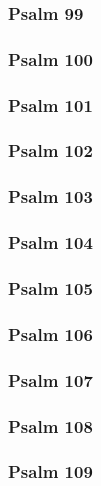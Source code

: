\documentclass[10pt]{extarticle}
\begin{document}
\begin{multicols}{2}
\subsubsection{Psalm 99}

\newpage

\subsubsection{Psalm 100}

\newpage

\subsubsection{Psalm 101}

\newpage

\subsubsection{Psalm 102}

\newpage

\subsubsection{Psalm 103}

\newpage

\subsubsection{Psalm 104}

\newpage

\subsubsection{Psalm 105}

\newpage

\subsubsection{Psalm 106}

\newpage

\subsubsection{Psalm 107}

\newpage

\subsubsection{Psalm 108}

\newpage

\subsubsection{Psalm 109}

\newpage


\end{multicols}
\end{document}
